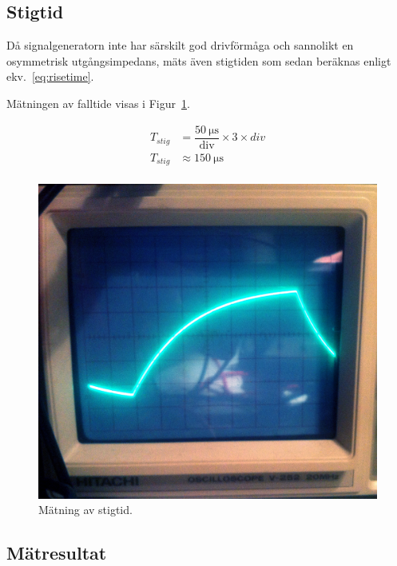 \subsection{Stigtid}
Då signalgeneratorn inte har särskilt god drivförmåga och sannolikt en
osymmetrisk utgångsimpedans, mäts även stigtiden som sedan beräknas enligt
ekv.~\eqref{eq:risetime}.

Mätningen av falltide visas i Figur~\ref{fig:stig-foto}.

\begin{equation}\label{eq:risetime}
  \begin{split}
    T_{stig} &= \dfrac{\SI{50}{\micro\second}}{\text{div}} \times 3 \times div \\
    T_{stig} &\approx \SI{150}{\micro\second} \\
  \end{split}
\end{equation}

\begin{figure}
  \centering
  \includegraphics[width=\linewidth]{img/step_stig.jpg}
  \caption[] {Mätning av stigtid.}
  \label{fig:stig-foto}
\end{figure}


\subsection{Mätresultat}\label{}


